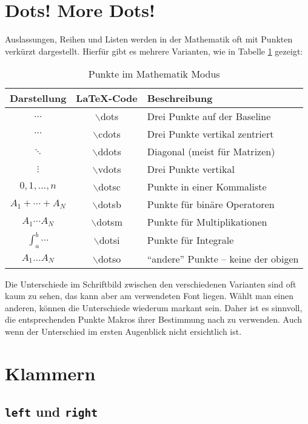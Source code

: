 \section{Dots! More Dots!}

Auslassungen, Reihen und Listen werden in der Mathematik oft mit Punkten verkürzt dargestellt. Hierfür gibt es mehrere Varianten, wie in Tabelle \ref{tab:dots} gezeigt:

\begin{table}[h]
\centering
\begin{tabular}{c|c|l}
\hline
\textbf{Darstellung} & \textbf{\LaTeX-Code} & \textbf{Beschreibung} \\
\hline
$\dots$ & $\backslash$dots & Drei Punkte auf der Baseline \\
$\cdots$ & $\backslash$cdots & Drei Punkte vertikal zentriert \\
$\ddots$ & $\backslash$ddots & Diagonal (meist für Matrizen) \\
$\vdots$ & $\backslash$vdots & Drei Punkte vertikal \\
$ 0,1, \dots , n$ & $\backslash$dotsc & Punkte in einer Kommaliste \\
$A_1+\dotsb+A_N$ & $\backslash$dotsb & Punkte für binäre Operatoren \\
$A_1 \dotsm A_N$ & $\backslash$dotsm & Punkte für Multiplikationen \\
$\int_a^b \dotsi$ & $\backslash$dotsi & Punkte für Integrale \\
$A_1\dotso A_N$ & $\backslash$dotso & "`andere"' Punkte -- keine der obigen \\
\hline
\end{tabular}
\caption{Punkte im Mathematik Modus}
\label{tab:dots}
\end{table}

Die Unterschiede im Schriftbild zwischen den verschiedenen Varianten sind oft kaum zu sehen, das kann aber am verwendeten Font liegen. Wählt man einen anderen, können die Unterschiede wiederum markant sein. Daher ist es sinnvoll, die entsprechenden Punkte Makros ihrer Bestimmung nach zu verwenden. Auch wenn der Unterschied im ersten Augenblick nicht ersichtlich ist. 

\section{Klammern}

\subsection{\texttt{left} und \texttt{right}}

